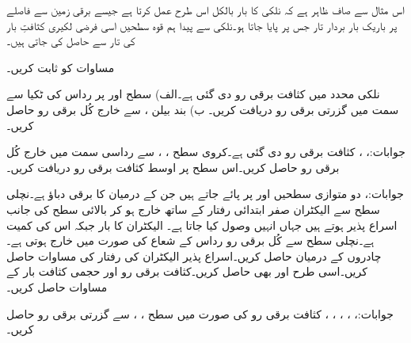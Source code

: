 \begin{itemize}
\end{itemize}

اس مثال سے صاف ظاہر ہے کہ نلکی کا بار بالکل اس طرح عمل کرتا ہے جیسے برقی زمین سے   فاصلے پر باریک بار بردار تار جس پر   پایا جاتا ہو۔نلکی سے پیدا ہم قوہ سطحیں اسی فرضی لکیری کثافتِ بار کی تار سے حاصل کی جاتی ہیں۔

مساوات  کو ثابت کریں۔
\newpage



نلکی محدد میں کثافت برقی رو  دی گئی ہے۔الف) سطح  اور  پر رداس  کی ٹکیا سے  سمت میں گزرتی برقی رو دریافت کریں۔ ب) بند بیلن ،  سے خارج کُل برقی رو حاصل کریں۔

جوابات:، ، 
کثافت برقی رو  دی گئی ہے۔کروی سطح ، ،  سے رداسی سمت میں خارج کُل برقی رو حاصل کریں۔اس سطح پر اوسط کثافت برقی رو دریافت کریں۔

جوابات:، 
دو متوازی سطحیں  اور  پر پائے جاتے ہیں جن کے درمیان  کا برقی دباؤ ہے۔نچلی سطح سے الیکٹران صفر ابتدائی رفتار کے ساتھ خارج ہو کر بالائی سطح کی جانب اسراع پذیر ہوتے ہیں جہاں انہیں وصول کیا جاتا ہے۔ الیکٹران کا بار  جبکہ اس کی کمیت  ہے۔نچلی سطح سے کُل  برقی رو  رداس کے شعاع کی صورت میں خارج ہوتی ہے۔چادروں کے درمیان  حاصل کریں۔اسراع پذیر الیکٹران کی رفتار  کی مساوات حاصل کریں۔اسی طرح  اور  بھی حاصل کریں۔کثافت برقی رو اور حجمی کثافت بار کے مساوات حاصل کریں۔

جوابات:، ، ، ، ،  
کثافت برقی رو  کی صورت میں سطح ،  ، سے گزرتی برقی رو حاصل کریں۔

